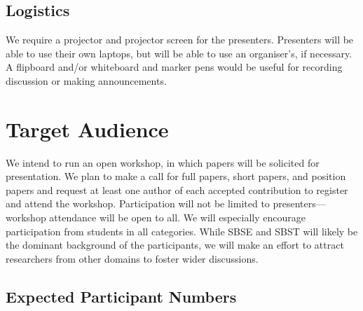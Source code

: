 \documentclass[sigconf,review]{acmart}
\begin{document}
\subsection{Logistics}

We require a projector and projector screen for the
presenters. Presenters will be able to use their own laptops, but will
be able to use an organiser's, if necessary. A flipboard and/or
whiteboard and marker pens would be useful for recording discussion or making
announcements.

\section{Target Audience}


We intend to run an open workshop, in which papers will be solicited
for presentation.  We plan to make a call for full papers, short
papers, and position papers and request at least one author of each
accepted contribution to register and attend the workshop.
Participation will not be limited to presenters---workshop attendance
will be open to all.  We will
especially encourage participation from students in all
categories.  
While SBSE and SBST will likely be the dominant background
of the participants, we will make an effort to attract researchers
from other domains to foster wider discussions.

\subsection{Expected Participant Numbers}
\label{sec:expectedparticipants}

\end{document}
